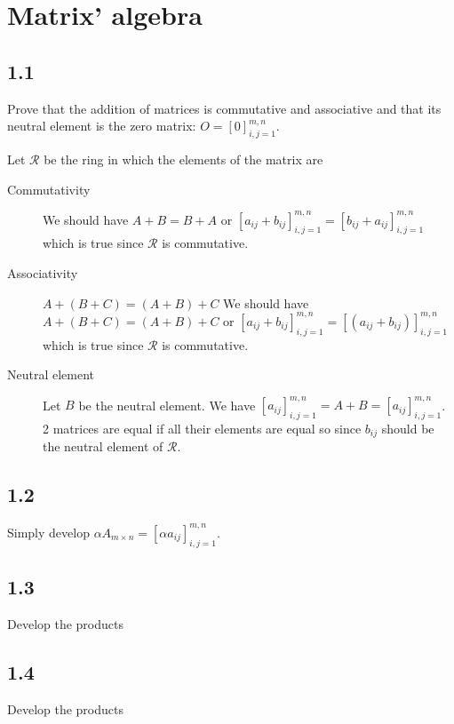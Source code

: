 \section{Matrix' algebra}
\subsection*{1.1}
Prove that the addition of matrices is commutative and associative and that its neutral element is the zero matrix: $O = [0]_{i,j=1}^{m,n}$.
\begin{solution}
  Let $\mathcal{R}$ be the ring in which the elements of the matrix are
  \begin{description}
    \item[Commutativity]
      We should have $A+B=B+A$ or
      $[a_{ij} + b_{ij}]_{i,j=1}^{m,n} = [b_{ij} + a_{ij}]_{i,j=1}^{m,n}$
      which is true since $\mathcal{R}$ is commutative.
    \item[Associativity] $A+(B+C)=(A+B)+C$
      We should have $A+(B+C)=(A+B)+C$ or
      $[a_{ij} + b_{ij}]_{i,j=1}^{m,n} = [(a_{ij} + b_{ij})]_{i,j=1}^{m,n}$
      which is true since $\mathcal{R}$ is commutative.
    \item[Neutral element] Let $B$ be the neutral element.
      We have
      $[a_{ij}]_{i,j=1}^{m,n} = A + B = [a_{ij}]_{i,j=1}^{m,n}$.
      2 matrices are equal if all their elements are equal so since $b_{ij}$
      should be the neutral element of $\mathcal{R}$.
  \end{description}
\end{solution}

\subsection*{1.2}
\begin{solution}
  Simply develop $\alpha A_{m \times n}=[\alpha a_{ij}]_{i,j=1}^{m,n}$.
\end{solution}

\subsection*{1.3}
\begin{solution}
  Develop the products
\end{solution}

\subsection*{1.4}
\begin{solution}
  Develop the products
\end{solution}

